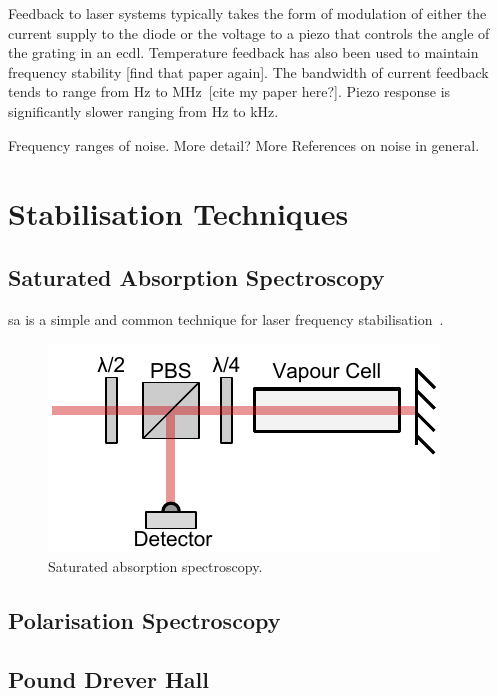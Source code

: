 Feedback to laser systems typically takes the form of modulation of either the current supply to the diode or the voltage to a piezo that controls the angle of the grating in an \gls{ecdl}.
Temperature feedback has also been used to maintain frequency stability {\color{red}[find that paper again]}.
The bandwidth of current feedback tends to range from \unit[0]{Hz} to MHz~\cite{ludlow_compact_2007}{\color{red}[cite my paper here?]}.
Piezo response is significantly slower ranging from \unit[0]{Hz} to \unit[100]{kHz}.

{\color{red}Frequency ranges of noise.}
{\color{red}More detail? More References on noise in general.}

\section{Stabilisation Techniques}
\subsection{Saturated Absorption Spectroscopy}
\Gls{sa} is a simple and common technique for laser frequency stabilisation~\cite{demtroder_laser_2003}.
 
\begin{figure}
\includegraphics[width=\linewidth]{chapter1/Figs/SatAbs.pdf}
\caption{Saturated absorption spectroscopy.}
\label{figure:satabs}
\end{figure}

\subsection{Polarisation Spectroscopy}

\subsection{Pound Drever Hall}

